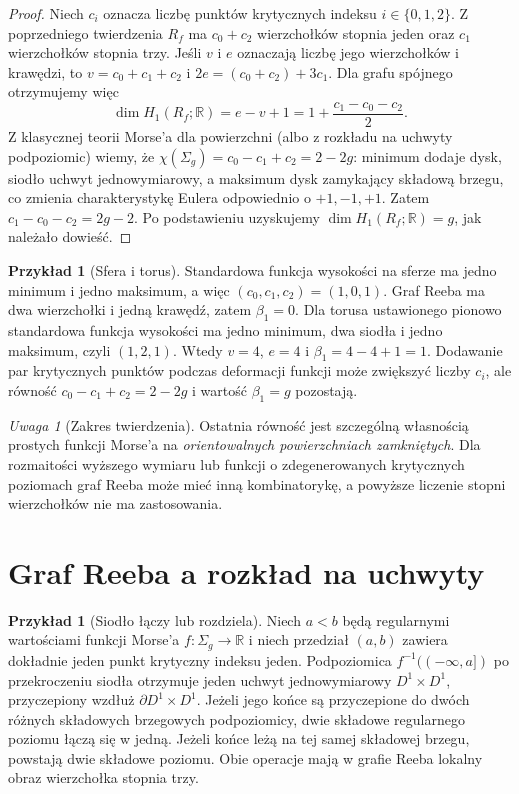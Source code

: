 \documentclass[11pt,a4paper]{report}
\numberwithin{equation}{section}
\theoremstyle{plain}
\theoremstyle{definition}
\newtheorem{przyklad}[twierdzenie]{Przykład}
\theoremstyle{remark}
\newtheorem{uwaga}[twierdzenie]{Uwaga}
\begin{document}
\begin{proof}
Niech $c_i$ oznacza liczbę punktów krytycznych indeksu
$i\in\{0,1,2\}$. Z poprzedniego twierdzenia $R_f$ ma
$c_0+c_2$ wierzchołków stopnia jeden oraz $c_1$
wierzchołków stopnia trzy. Jeśli $v$ i $e$ oznaczają
liczbę jego wierzchołków i krawędzi, to
$v=c_0+c_1+c_2$ i
$2e=(c_0+c_2)+3c_1$.
Dla grafu spójnego otrzymujemy więc
\[
\dim H_1(R_f;\mathbb R)=e-v+1
=1+\frac{c_1-c_0-c_2}{2}.
\]
Z klasycznej teorii Morse'a dla powierzchni (albo
z rozkładu na uchwyty podpoziomic) wiemy, że
$\chi(\Sigma_g)=c_0-c_1+c_2=2-2g$:
minimum dodaje dysk, siodło uchwyt jednowymiarowy,
a maksimum dysk zamykający składową brzegu, co zmienia
charakterystykę Eulera odpowiednio o $+1,-1,+1$.
Zatem $c_1-c_0-c_2=2g-2$. Po podstawieniu uzyskujemy
$\dim H_1(R_f;\mathbb R)=g$, jak należało dowieść.
\end{proof}

\begin{przyklad}[Sfera i torus]
Standardowa funkcja wysokości na sferze ma jedno minimum
i jedno maksimum, a więc $(c_0,c_1,c_2)=(1,0,1)$.
Graf Reeba ma dwa wierzchołki i jedną krawędź,
zatem $\beta_1=0$. Dla torusa ustawionego pionowo
standardowa funkcja wysokości ma jedno minimum,
dwa siodła i jedno maksimum, czyli $(1,2,1)$.
Wtedy $v=4$, $e=4$ i $\beta_1=4-4+1=1$.
Dodawanie par krytycznych punktów podczas deformacji
funkcji może zwiększyć liczby $c_i$, ale równość
$c_0-c_1+c_2=2-2g$ i wartość $\beta_1=g$ pozostają.
\end{przyklad}

\begin{uwaga}[Zakres twierdzenia]
Ostatnia równość jest szczególną własnością prostych
funkcji Morse'a na \emph{orientowalnych powierzchniach
zamkniętych}. Dla rozmaitości wyższego wymiaru
lub funkcji o zdegenerowanych krytycznych poziomach
graf Reeba może mieć inną kombinatorykę, a powyższe
liczenie stopni wierzchołków nie ma zastosowania.
\end{uwaga}

\section{Graf Reeba a rozkład na uchwyty}
\label{sec:tg-reeb-handles}

\begin{przyklad}[Siodło łączy lub rozdziela]
Niech $a<b$ będą regularnymi wartościami funkcji
Morse'a $f:\Sigma_g\to\mathbb R$ i niech przedział
$(a,b)$ zawiera dokładnie jeden punkt krytyczny indeksu
jeden. Podpoziomica $f^{-1}(( -\infty,a])$ po przekroczeniu
siodła otrzymuje jeden uchwyt jednowymiarowy
$D^1\times D^1$, przyczepiony wzdłuż
$\partial D^1\times D^1$. Jeżeli jego końce są przyczepione
do dwóch różnych składowych brzegowych podpoziomicy,
dwie składowe regularnego poziomu łączą się w jedną.
Jeżeli końce leżą na tej samej składowej brzegu,
powstają dwie składowe poziomu. Obie operacje mają
w grafie Reeba lokalny obraz wierzchołka stopnia trzy.
\end{przyklad}
\end{document}
